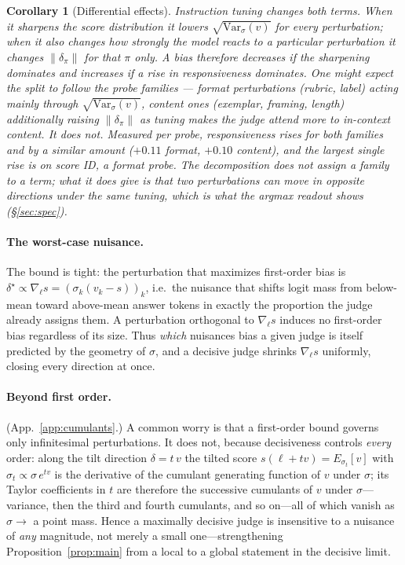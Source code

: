 \documentclass[11pt]{article}
\newtheorem{corollary}{Corollary}
\begin{document}
\begin{corollary}[Differential effects]\label{cor:diff}
Instruction tuning changes both terms. When it sharpens the score distribution it
lowers $\sqrt{\mathrm{Var}_\sigma(v)}$ for \emph{every} perturbation; when it also
changes how strongly the model reacts to a particular perturbation it changes
$\|\delta_\pi\|$ for that $\pi$ only. A bias therefore \emph{decreases} if the
sharpening dominates and \emph{increases} if a rise in responsiveness dominates. One might expect the
split to follow the probe families --- format perturbations (rubric, label) acting mainly
through $\sqrt{\mathrm{Var}_\sigma(v)}$, content ones (exemplar, framing, length)
additionally raising $\|\delta_\pi\|$ as tuning makes the judge attend more to
in-context content. It does not. Measured per probe, responsiveness rises for both
families and by a similar amount ($+0.11$ format, $+0.10$ content), and the largest
single rise is on score ID, a format probe. The decomposition does not assign a family
to a term; what it does give is that two perturbations can move in opposite directions
under the same tuning, which is what the argmax readout shows
(\S\ref{sec:spec}).
\end{corollary}

\paragraph{The worst-case nuisance.} The bound is tight: the perturbation that maximizes
first-order bias is $\delta^\star \propto \nabla_\ell s = (\sigma_k(v_k-s))_k$, i.e.\ the
nuisance that shifts logit mass from below-mean toward above-mean answer tokens in
exactly the proportion the judge already assigns them. A perturbation orthogonal to
$\nabla_\ell s$ induces no first-order bias regardless of its size. Thus \emph{which}
nuisances bias a given judge is itself predicted by the geometry of $\sigma$, and a
decisive judge shrinks $\nabla_\ell s$ uniformly, closing every direction at once.

\paragraph{Beyond first order.} (App.~\ref{app:cumulants}.) A common worry is that a first-order bound governs only
infinitesimal perturbations. It does not, because decisiveness controls \emph{every}
order: along the tilt direction $\delta=t\,v$ the tilted score $s(\ell+tv)=E_{\sigma_t}[v]$
with $\sigma_t\propto\sigma\,e^{tv}$ is the derivative of the cumulant generating function
of $v$ under $\sigma$; its Taylor coefficients in $t$ are therefore the successive
cumulants of $v$ under $\sigma$---variance, then the third and fourth cumulants, and so
on---all of which vanish as $\sigma\!\to\!$ a point mass. Hence a
maximally decisive judge is insensitive to a nuisance of \emph{any} magnitude, not merely
a small one---strengthening Proposition~\ref{prop:main} from a local to a global
statement in the decisive limit.
\end{document}
